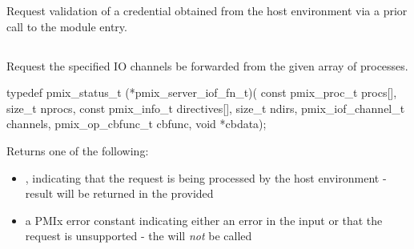 \descr

Request validation of a credential obtained from the host environment via a prior call to the  module entry.

\subsection{}

\summary

Request the specified IO channels be forwarded from the given array of processes.

\format

\cspecificstart
\begin{codepar}
typedef pmix_status_t (*pmix_server_iof_fn_t)(
                        const pmix_proc_t procs[], size_t nprocs,
                        const pmix_info_t directives[], size_t ndirs,
                        pmix_iof_channel_t channels,
                        pmix_op_cbfunc_t cbfunc, void *cbdata);
\end{codepar}
\cspecificend

\begin{arglist}
\end{arglist}

Returns one of the following:

\begin{itemize}
    \item {}, indicating that the request is being processed by the host environment - result will be returned in the provided 
    \item a PMIx error constant indicating either an error in the input or that the request is unsupported - the  will \textit{not} be called
\end{itemize}

